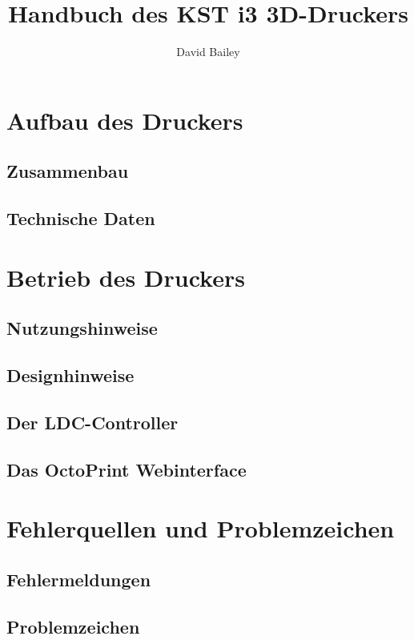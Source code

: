\documentclass[11pt,a4paper]{article}
\title{Handbuch des KST i3 3D-Druckers}
\author{David Bailey}
\begin{document}
\maketitle
\newpage

\tableofcontents

\newpage
\section{Aufbau des Druckers}
\subsection{Zusammenbau}

\newpage
\subsection{Technische Daten}


\newpage
\section{Betrieb des Druckers}
\subsection{Nutzungshinweise}

\subsection{Designhinweise}

\subsection{Der LDC-Controller}

\subsection{Das OctoPrint Webinterface}


\newpage
\section{Fehlerquellen und Problemzeichen}
\subsection{Fehlermeldungen}

\subsection{Problemzeichen}

\end{document}
